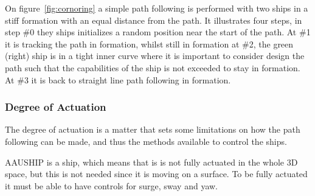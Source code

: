 On figure~\vref{fig:cornoring} a simple path following is performed
with two ships in a stiff formation with an equal distance from the
path. It illustrates four steps, in step \#0 they ships initializes a
random position near the start of the path. At \#1 it is tracking the
path in formation, whilst still in formation at \#2, the green
(right) ship is in a tight inner curve where it is important to
consider design the path such that the capabilities of the ship is not
exceeded to stay in formation. At \#3 it is back to straight line path
following in formation.


\subsubsection{Degree of Actuation}
The degree of actuation is a matter that sets some limitations on how
the path following can be made, and thus the methods available to
control the ships.

AAUSHIP is a ship, which means that is is not fully actuated in the
whole 3D space, but this is not needed since it is moving on a
surface. To be fully actuated it must be able to have controls for
surge, sway and yaw.

